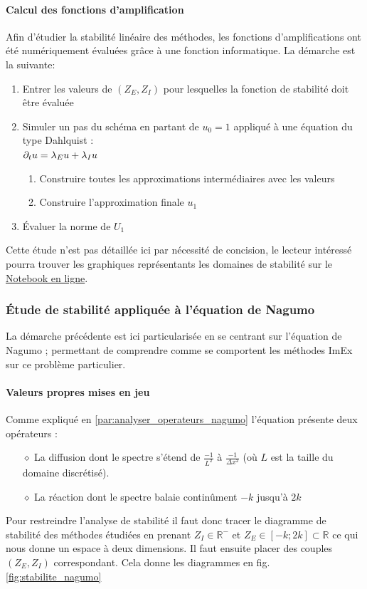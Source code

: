     \paragraph{Calcul des fonctions d'amplification }
    Afin d'étudier la stabilité linéaire des méthodes, les fonctions d'amplifications ont été numériquement évaluées grâce à une fonction informatique. 
    La démarche est la suivante:
    \begin{enumerate}
        \item Entrer les valeurs de $(Z_E,Z_I)$ pour lesquelles la fonction de stabilité doit être évaluée
        \item Simuler un pas du schéma en partant de $u_0 = 1$ appliqué à une équation du type Dahlquist :\\$\partial_t u = \lambda_E u + \lambda_I u$
        \begin{enumerate}
            \item Construire toutes les approximations intermédiaires avec les valeurs 
            \item Construire l'approximation finale $u_1$
        \end{enumerate}
        \item Évaluer la norme de $U_1$
    \end{enumerate}
    Cette étude n'est pas détaillée ici par nécessité de concision,
    le lecteur intéressé pourra trouver les graphiques représentants les domaines de stabilité sur le \href{https://github.com/Ocelot-Pale/ImEx_stability_Nagumo}{Notebook en ligne}.


\subsubsection{Étude de stabilité appliquée à l'équation de Nagumo}
    La démarche précédente est ici particularisée en se centrant sur l'équation de Nagumo ; permettant de comprendre
    comme se comportent les méthodes ImEx sur ce problème particulier.
    \paragraph{Valeurs propres mises en jeu}
        Comme expliqué en \ref{par:analyser_operateurs_nagumo} l'équation présente deux opérateurs : 
        \begin{itemize}
            \item[$\diamond$] La diffusion dont le spectre s'étend de $\frac{-1}{L^2}$ à $\frac{-1}{\Delta x^2}$ (où $L$ est la taille du domaine discrétisé).
            \item[$\diamond$] La réaction dont le spectre balaie continûment $-k$ jusqu'à $2k$
        \end{itemize}
        Pour restreindre l'analyse de stabilité il faut donc tracer le diagramme de stabilité des méthodes étudiées en prenant $Z_I \in \mathbb{R}^-$ 
        et $Z_E \in [-k;2k] \subset \mathbb{R}$ ce qui nous donne un espace à deux dimensions. Il faut ensuite placer des couples $(Z_E,Z_I)$ correspondant.
        Cela donne les diagrammes en fig. \ref{fig:stabilite_nagumo}
